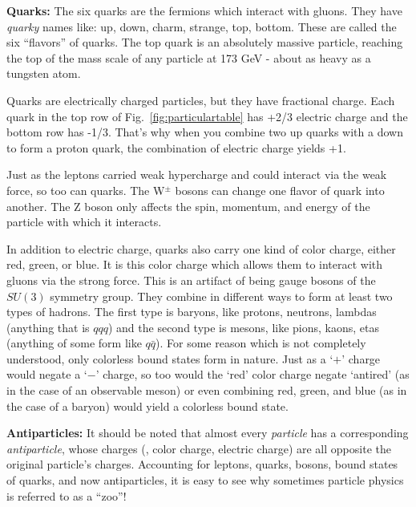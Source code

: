 
{\bf Quarks:}
The six quarks are the fermions which interact with gluons.
They have \emph{quarky} names like: 
up, down, charm, strange, top, bottom. 
These are called the six ``flavors'' of quarks.
The top quark is an absolutely massive particle, reaching the top of the mass scale of any particle at 173 GeV - about as heavy as a tungsten atom.

Quarks are electrically charged particles, but they have fractional charge.
Each quark in the top row of Fig.~\ref{fig:particulartable} has +2/3 electric charge and the bottom row has -1/3.
That's why when you combine two up quarks with a down to form a proton quark, the combination of electric charge yields +1.

Just as the leptons carried weak hypercharge and could interact via the weak force, so too can quarks. 
The W$^{\pm}$ bosons can change one flavor of quark into another.
The Z boson only affects the spin, momentum, and energy of the particle with which it interacts.

In addition to electric charge, quarks also carry one kind of color charge, either red, green, or blue. 
It is this color charge which allows them to interact with gluons via the strong force. 
This is an artifact of being gauge bosons of the $SU(3)$ symmetry group.
They combine in different ways to form at least two types of hadrons.
The first type is baryons, like protons, neutrons, lambdas (anything that is $qqq$) and the second type is mesons, like pions, kaons, etas (anything of some form like $q\bar{q}$).
For some reason which is not completely understood, only colorless bound states form in nature. 
Just as a `$+$' charge would negate a `$-$' charge, so too would the `red' color charge negate `antired' (as in the case of an observable meson) or even combining red, green, and blue (as in the case of a baryon) would yield a colorless bound state.

{\bf Antiparticles:} It should be noted that almost every \emph{particle} has a corresponding \emph{antiparticle}, whose charges (\eg, color charge, electric charge) are all opposite the original particle's charges.
Accounting for leptons, quarks, bosons, bound states of quarks, and now antiparticles, it is easy to see why sometimes particle physics is referred to as a ``zoo''!

